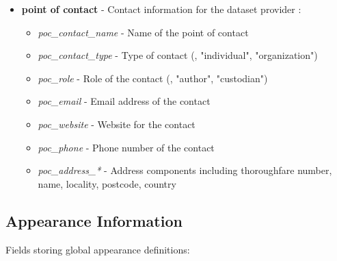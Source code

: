 \begin{itemize}
  \item \textbf{point of contact} - Contact information for the dataset provider \citep{cityjson_spec}:
    \begin{itemize}
      \item \textit{poc\_contact\_name} - Name of the point of contact
      \item \textit{poc\_contact\_type} - Type of contact (\eg, "individual", "organization")
      \item \textit{poc\_role} - Role of the contact (\eg, "author", "custodian")
      \item \textit{poc\_email} - Email address of the contact
      \item \textit{poc\_website} - Website for the contact
      \item \textit{poc\_phone} - Phone number of the contact
      \item \textit{poc\_address\_*} - Address components including thoroughfare number, name, locality, postcode, country
    \end{itemize}
\end{itemize}


\subsection{Appearance Information}
\label{methodology:header:appearance}

Fields storing global appearance definitions:


